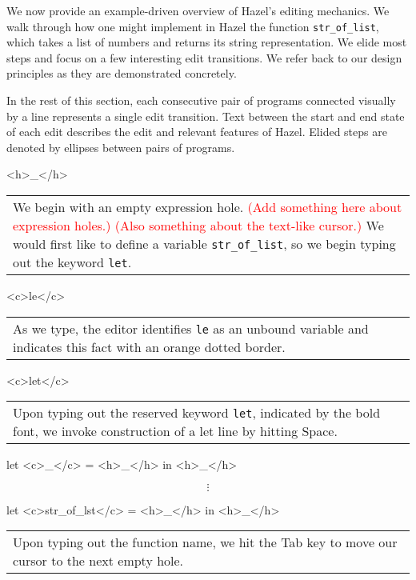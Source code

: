 \documentclass[runningheads]{llncs}
\newcommand{\Hazel}{\textsf{Hazel}\xspace}
\begin{document}
We now provide an example-driven overview of \Hazel's editing mechanics.
We walk through how one might implement in \Hazel the function \texttt{str\_of\_list},
which takes a list of numbers and returns its string representation. We
elide most steps and focus on a few interesting edit transitions. We refer
back to our design principles as they are demonstrated concretely.

In the rest of this section, each consecutive pair of programs connected
visually by a line represents a single edit transition. Text between the
start and end state of each edit describes the edit and relevant features of
\Hazel. Elided steps are denoted by ellipses between pairs of programs.

\noindent
\begin{hazel}
<h>_</h>
\end{hazel}
	\begin{tabular}{|p{\linewidth}}
	We begin with an empty expression hole.
	\textcolor{red}{(Add something here about expression holes.)}
	\textcolor{red}{(Also something about the text-like cursor.)}
	We would first like to define a variable \texttt{str\_of\_list}, so we begin typing out the keyword
	\texttt{let}. 
	\end{tabular}
\begin{hazel}
<c>le</c>
\end{hazel}
	\begin{tabular}{|p{\linewidth}}
	As we type, the editor identifies \texttt{le} as an unbound variable and indicates this
	fact with an orange dotted border.
	\end{tabular}
\begin{hazel}
<c>let</c>
\end{hazel}
	\begin{tabular}{|p{\linewidth}}
	Upon typing out the reserved keyword \texttt{let}, indicated by the bold font, we invoke
	construction of a let line by hitting Space.
	\end{tabular}
\begin{hazel}
let <c>_</c> = <h>_</h> in
<h>_</h>
\end{hazel}
	\[\vdots\]
\begin{hazel}
let <c>str_of_lst</c> = <h>_</h> in
<h>_</h>
\end{hazel}
	\begin{tabular}{|p{\linewidth}}
	Upon typing out the function name, we hit the Tab key to move our cursor to the next empty hole.
	\end{tabular}
\end{document}
